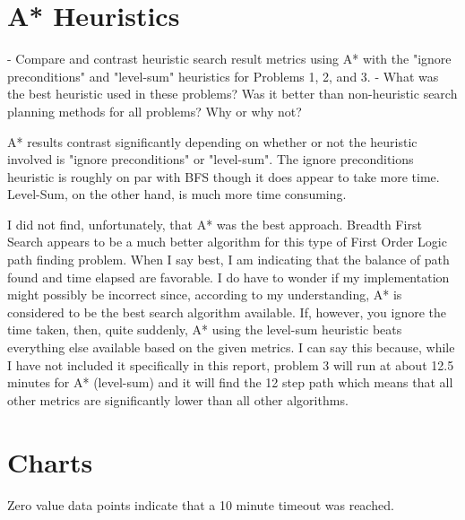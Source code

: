 \documentclass[10pt, a4paper]{article}
\begin{document}
\section{A* Heuristics}
- Compare and contrast heuristic search result metrics using A* with the "ignore preconditions" and "level-sum" heuristics for Problems 1, 2, and 3.
- What was the best heuristic used in these problems?  Was it better than non-heuristic search planning methods for all problems?  Why or why not?

A* results contrast significantly depending on whether or not the heuristic involved is "ignore preconditions" or "level-sum".  The ignore preconditions heuristic
is roughly on par with BFS though it does appear to take more time.  Level-Sum, on the other hand, is much more time consuming.

I did not find, unfortunately, that A* was the best approach.  Breadth First Search appears to be a much better algorithm for this type of First Order Logic
path finding problem.  When I say best, I am indicating that the balance of path found and time elapsed are favorable.  
I do have to wonder if my implementation might possibly be incorrect since, according to my understanding, A* is considered to be the 
best search algorithm available.  If, however, you ignore the time taken, then, quite suddenly, A* using the level-sum heuristic beats everything else available
based on the given metrics.
I can say this because, while I have not included it specifically in this report, 
problem 3 will run at about 12.5 minutes for A* (level-sum) and it will find the 12 step path which means
that all other metrics are significantly lower than all other algorithms.

\section{Charts}

Zero value data points indicate that a 10 minute timeout was reached.
\end{document}

